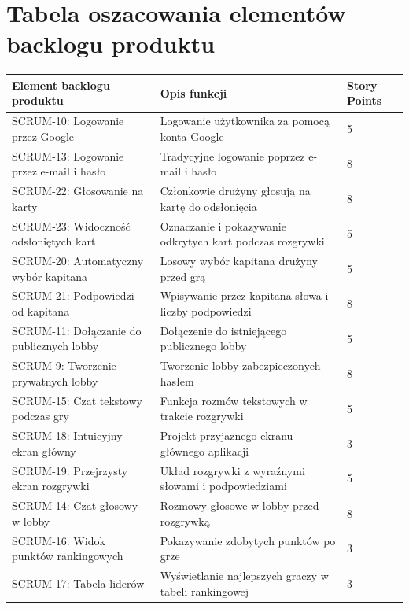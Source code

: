 \documentclass[12pt,a4paper,colorlinks=true,linkcolor=NavyBlue,citecolor=red,urlcolor=NavyBlue]{book}
\begin{document}
\section{Tabela oszacowania elementów backlogu produktu}
\begin{center}
\begin{tabular}{|p{5cm}|p{7cm}|p{2cm}|}
\hline
\textbf{Element backlogu produktu} & \textbf{Opis funkcji} & \textbf{Story Points} \\
\hline
SCRUM-10: Logowanie przez Google & Logowanie użytkownika za pomocą konta Google & 5 \\
\hline
SCRUM-13: Logowanie przez e-mail i hasło & Tradycyjne logowanie poprzez e-mail i hasło & 8 \\
\hline
SCRUM-22: Głosowanie na karty & Członkowie drużyny głosują na kartę do odsłonięcia & 8 \\
\hline
SCRUM-23: Widoczność odsłoniętych kart & Oznaczanie i pokazywanie odkrytych kart podczas rozgrywki & 5 \\
\hline
SCRUM-20: Automatyczny wybór kapitana & Losowy wybór kapitana drużyny przed grą & 5 \\
\hline
SCRUM-21: Podpowiedzi od kapitana & Wpisywanie przez kapitana słowa i liczby podpowiedzi & 8 \\
\hline
SCRUM-11: Dołączanie do publicznych lobby & Dołączenie do istniejącego publicznego lobby & 5 \\
\hline
SCRUM-9: Tworzenie prywatnych lobby & Tworzenie lobby zabezpieczonych hasłem & 8 \\
\hline
SCRUM-15: Czat tekstowy podczas gry & Funkcja rozmów tekstowych w trakcie rozgrywki & 5 \\
\hline
SCRUM-18: Intuicyjny ekran główny & Projekt przyjaznego ekranu głównego aplikacji & 3 \\
\hline
SCRUM-19: Przejrzysty ekran rozgrywki & Układ rozgrywki z wyraźnymi słowami i podpowiedziami & 5 \\
\hline
SCRUM-14: Czat głosowy w lobby & Rozmowy głosowe w lobby przed rozgrywką & 8 \\
\hline
SCRUM-16: Widok punktów rankingowych & Pokazywanie zdobytych punktów po grze & 3 \\
\hline
SCRUM-17: Tabela liderów & Wyświetlanie najlepszych graczy w tabeli rankingowej & 3 \\
\hline
\end{tabular}
\end{center}

\newpage
\thispagestyle{empty}
\null
\newpage
\end{document}
